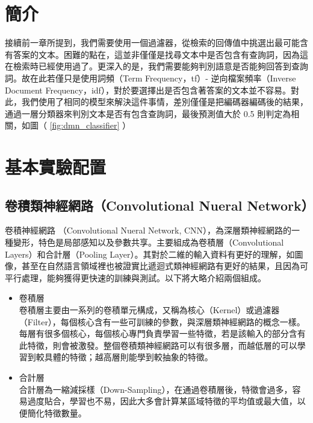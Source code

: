 \section{簡介}
接續前一章所提到，我們需要使用一個過濾器，從檢索的回傳值中挑選出最可能含有答案的文本。困難的點在，這並非僅僅是找尋文本中是否包含有查詢詞，因為這在檢索時已經使用過了。更深入的是，我們需要能夠判別語意是否能夠回答到查詢詞。故在此若僅只是使用詞頻（Term Frequency，tf）- 逆向檔案頻率（Inverse Document Frequency，idf），對於要選擇出是否包含著答案的文本並不容易。對此，我們使用了相同的模型來解決這件事情，差別僅僅是把編碼器編碼後的結果，通過一層分類器來判別文本是否有包含查詢詞，最後預測值大於 0.5 則判定為相關，如圖（ \ref{fig:dmn_classifier} ）

\section{基本實驗配置}
\subsection{卷積類神經網路（Convolutional Nueral Network）}
卷積神經網路 \cite{sharif2014cnn}（Convolutional Nueral Network, CNN），為深層類神經網路的一種變形，特色是局部感知以及參數共享。主要組成為卷積層（Convolutional Layers）和合計層（Pooling Layer）。其對於二維的輸入資料有更好的理解，如圖像，甚至在自然語言領域裡也被證實比遞迴式類神經網路有更好的結果，且因為可平行處理，能夠獲得更快速的訓練與測試。以下將大略介紹兩個組成。
\begin{itemize}
    \itemsep - 2pt
    \item 卷積層\\
        卷積層主要由一系列的卷積單元構成，又稱為核心（Kernel）或過濾器（Filter），每個核心含有一些可訓練的參數，與深層類神經網路的概念一樣。每層有很多個核心，每個核心專門負責學習一些特徵，若是該輸入的部分含有此特徵，則會被激發。整個卷積類神經網路可以有很多層，而越低層的可以學習到較具體的特徵；越高層則能學到較抽象的特徵。
    \item 合計層 \\
        合計層為一縮減採樣（Down-Sampling），在通過卷積層後，特徵會過多，容易過度貼合，學習也不易，因此大多會計算某區域特徵的平均值或最大值，以便簡化特徵數量。
\end{itemize}

